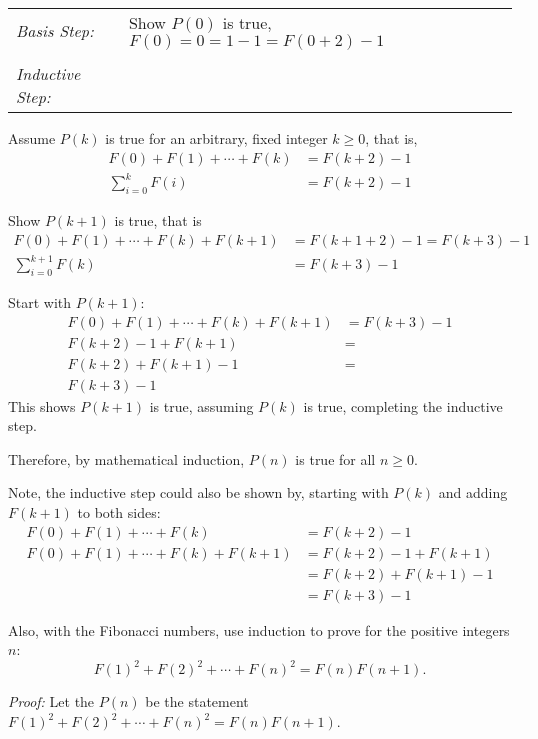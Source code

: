 \documentclass[10pt,addpoints]{exam}
\begin{document}
\begin{questions}
\begin{solution}
	\smallskip
	\begin{tabular}{lp{4in}}
	  \textit{Basis Step:} & Show $P(0)$ is true, $F(0) = 0 = 1 - 1 = F(0+2) - 1$ \\
	   & \\
	 \textit{Inductive Step:} &  \\
	\end{tabular}

	Assume $P(k)$ is true for an arbitrary, fixed integer $k \geq 0$, that is,
	\begin{align*}
		F(0) + F(1) + \cdots + F(k) &= F(k+2) - 1  \tag{IH} \\
		\sum_{i=0}^k F(i) &= F(k+2) - 1
	\end{align*}

	Show $P(k+1)$ is true, that is
	\begin{align*}
	 	F(0) + F(1) + \cdots + F(k) + F(k+1) &= F(k+1+2) - 1 = F(k+3) - 1 \\
	 	\sum_{i=0}^{k+1} F(k) &= F(k+3) - 1
	\end{align*}

	Start with $P(k+1)$:
	\begin{align*}
		F(0) + F(1) + \cdots + F(k) + F(k+1) &= F(k+3) - 1  \\
		F(k+2) - 1 + F(k+1) &= \tag{IH} \\
		F(k+2) + F(k+1) - 1 &= \\
		F(k+3) - 1
	\end{align*}
	This shows $P(k+1)$ is true, assuming $P(k)$ is true, completing the inductive step. 

	\smallskip
	Therefore, by mathematical induction, $P(n)$ is true for all $n \geq 0$.

	\smallskip
	Note, the inductive step could also be shown by, starting with $P(k)$ and adding $F(k+1)$ to both sides:
	\begin{align*}
		F(0) + F(1) + \cdots + F(k) &= F(k+2) - 1 \tag{IH} \\
		F(0) + F(1) + \cdots + F(k) + F(k+1) &= F(k+2) - 1 + F(k+1) \\
		 &= F(k+2) + F(k+1) - 1 \\
		 &= F(k+3) -1 
	\end{align*}
\end{solution}


\question[10]  Also, with the Fibonacci numbers, use induction to prove for the positive integers $n$: 
\[ F(1)^2 + F(2)^2 + \cdots + F(n)^2 = F(n)F(n+1). \]
    \ifprintanswers
        \vspace{-10pt}
   \fi
\begin{solution}
	\textit{Proof:}
	Let the $P(n)$ be the statement $F(1)^2 + F(2)^2 + \cdots + F(n)^2 = F(n)F(n+1)$.


\end{solution}
\end{questions}
\end{document}
